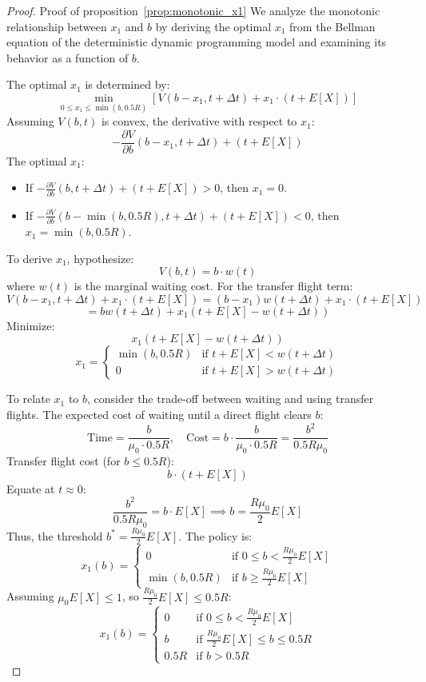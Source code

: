 \documentclass[opre,sglanonrev]{informs4}
\begin{document}
\begin{proof}{Proof of proposition~\ref{prop:monotonic_x1}}
We analyze the monotonic relationship between \( x_1 \) and \( b \) by deriving the optimal \( x_1 \) from the Bellman equation of the deterministic dynamic programming model and examining its behavior as a function of \( b \).

The optimal \( x_1 \) is determined by:
\[
\min_{0 \leq x_1 \leq \min(b, 0.5R)} \left[ V(b - x_1, t + \Delta t) + x_1 \cdot (t + E[X]) \right]
\]
Assuming \( V(b, t) \) is convex, the derivative with respect to \( x_1 \):
\[
-\frac{\partial V}{\partial b}(b - x_1, t + \Delta t) + (t + E[X])
\]
The optimal \( x_1 \):
\begin{itemize}
    \item If \( -\frac{\partial V}{\partial b}(b, t + \Delta t) + (t + E[X]) > 0 \), then \( x_1 = 0 \).
    \item If \( -\frac{\partial V}{\partial b}(b - \min(b, 0.5R), t + \Delta t) + (t + E[X]) < 0 \), then \( x_1 = \min(b, 0.5R) \).
\end{itemize}

To derive \( x_1 \), hypothesize:
\[
V(b, t) = b \cdot w(t)
\]
where \( w(t) \) is the marginal waiting cost. For the transfer flight term:
\[
V(b - x_1, t + \Delta t) + x_1 \cdot (t + E[X]) = (b - x_1) w(t + \Delta t) + x_1 \cdot (t + E[X])
\]
\[
= b w(t + \Delta t) + x_1 (t + E[X] - w(t + \Delta t))
\]
Minimize:
\[
x_1 (t + E[X] - w(t + \Delta t))
\]
\[
x_1 = \begin{cases} 
\min(b, 0.5R) & \text{if } t + E[X] < w(t + \Delta t) \\
0 & \text{if } t + E[X] > w(t + \Delta t)
\end{cases}
\]

To relate \( x_1 \) to \( b \), consider the trade-off between waiting and using transfer flights. The expected cost of waiting until a direct flight clears \( b \):
\[
\text{Time} = \frac{b}{\mu_0 \cdot 0.5R}, \quad \text{Cost} = b \cdot \frac{b}{\mu_0 \cdot 0.5R} = \frac{b^2}{0.5 R \mu_0}
\]
Transfer flight cost (for \( b \leq 0.5R \)):
\[
b \cdot (t + E[X])
\]
Equate at \( t \approx 0 \):
\[
\frac{b^2}{0.5 R \mu_0} = b \cdot E[X] \implies b = \frac{R \mu_0}{2} E[X]
\]
Thus, the threshold \( b^* = \frac{R \mu_0}{2} E[X] \). The policy is:
\[
x_1(b) = \begin{cases} 
0 & \text{if } 0 \leq b < \frac{R \mu_0}{2} E[X] \\
\min(b, 0.5R) & \text{if } b \geq \frac{R \mu_0}{2} E[X]
\end{cases}
\]
Assuming \( \mu_0 E[X] \leq 1 \), so \( \frac{R \mu_0}{2} E[X] \leq 0.5R \):
\[
x_1(b) = \begin{cases} 
0 & \text{if } 0 \leq b < \frac{R \mu_0}{2} E[X] \\
b & \text{if } \frac{R \mu_0}{2} E[X] \leq b \leq 0.5R \\
0.5R & \text{if } b > 0.5R
\end{cases}
\]


\end{proof}
\end{document}
